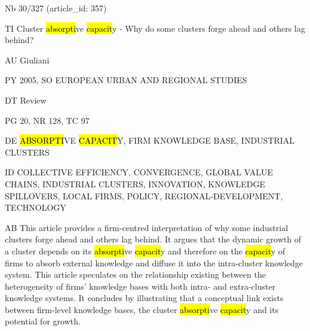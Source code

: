 \documentclass[a4paper]{article}
\begin{document}
\vspace*{-2cm}
Nb \tabto{0cm}30/327 (article\_id: 357)\par
TI \tabto{0cm}Cluster \hl{absorpti}ve \hl{capacit}y - Why do some clusters forge ahead and others lag behind?\par
AU \tabto{0cm}Giuliani\par
PY \tabto{0cm}2005, SO EUROPEAN URBAN AND REGIONAL STUDIES\par
DT \tabto{0cm}Review\par
PG \tabto{0cm}20, NR 128, TC 97\par
DE \tabto{0cm}\hl{ABSORPTI}VE \hl{CAPACIT}Y, FIRM KNOWLEDGE BASE, INDUSTRIAL CLUSTERS\par
ID \tabto{0cm}COLLECTIVE EFFICIENCY, CONVERGENCE, GLOBAL VALUE CHAINS, INDUSTRIAL CLUSTERS, INNOVATION, KNOWLEDGE SPILLOVERS, LOCAL FIRMS, POLICY, REGIONAL-DEVELOPMENT, TECHNOLOGY\par
AB \tabto{0cm}This article provides a firm-centred interpretation of why some industrial clusters forge ahead and others lag behind. It argues that the dynamic growth of a cluster depends on its \hl{absorpti}ve \hl{capacit}y and therefore on the \hl{capacit}y of firms to absorb external knowledge and diffuse it into the intra-cluster knowledge system. This article speculates on the relationship existing between the heterogeneity of firms' knowledge bases with both intra- and extra-cluster knowledge systems. It concludes by illustrating that a conceptual link exists between firm-level knowledge bases, the cluster \hl{absorpti}ve \hl{capacit}y and its potential for growth.\par
\clearpage
\end{document}
